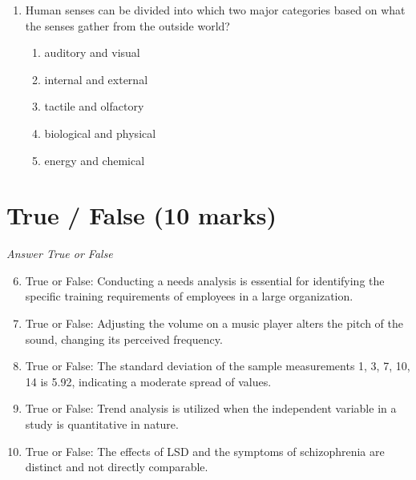 \documentclass[12pt]{article}
\begin{document}
\begin{enumerate}[label=\arabic*.]
\begin{enumerate}[label=(\alph*)]
    \item cell body
    \item myelin
    \item synaptic vesicles
    \item glial cells
    \item terminal buttons
\end{enumerate}
\item Human senses can be divided into which two major categories based on what the senses gather from the outside world?
\begin{enumerate}[label=(\alph*)]
    \item auditory and visual
    \item internal and external
    \item tactile and olfactory
    \item biological and physical
    \item energy and chemical
\end{enumerate}
\end{enumerate}

\section*{True / False (10 marks)}
\textit{Answer True or False}
\begin{enumerate}[label=\arabic*.]
\setcounter{enumi}{5}
\item True or False: Conducting a needs analysis is essential for identifying the specific training requirements of employees in a large organization.
\item True or False: Adjusting the volume on a music player alters the pitch of the sound, changing its perceived frequency.
\item True or False: The standard deviation of the sample measurements 1, 3, 7, 10, 14 is 5.92, indicating a moderate spread of values.
\item True or False: Trend analysis is utilized when the independent variable in a study is quantitative in nature.
\item True or False: The effects of LSD and the symptoms of schizophrenia are distinct and not directly comparable.
\end{enumerate}
\end{document}
